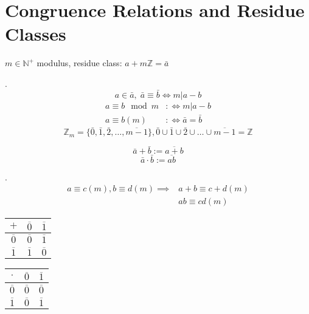 
\section{Congruence Relations and Residue Classes}

\begin{definition}
$m \in \mathbb{N}^{+}$ modulus,
residue class: $a+m \mathbb{Z} = \bar{a}$
\end{definition}

\Remark.
\[
  a\in \bar{a},\; \bar{a} \equiv \bar{b} \iff m | a-b
\]
\begin{align*}
  a \equiv b \mod m & :\iff m | a-b \\
  a \equiv b (m)     & :\iff \bar{a} = \bar{b}
\end{align*}
\[
  \mathbb{Z}_m = \{ \bar{0},\bar{1},\bar{2}, \ldots, \overline{m-1}\} ,
  \bar{0} \cup \bar{1} \cup \bar{2} \cup  \ldots \cup \overline{m-1} = \mathbb{Z}
\]

\begin{definition}
\[
  \bar{a} + \bar{b} := \overline{a+b}
\]
\[
  \bar{a} \cdot \bar{b} := \overline{ab}
\]
\end{definition}

\Remark.
\begin{align*}
  a \equiv c(m), b \equiv d(m) \implies & a+b \equiv c+d(m) \\
                                        & ab \equiv cd (m)
\end{align*}
\begin{center}
\begin{minipage}[t]{0.2\textwidth}
    \begin{tabular}{c|cc}
      $+$             & $\overline{0}$  & $\overline{1}$\\
      \hline
      $\overline{0}$  & $\overline{0}$  & $\overline{1}$\\
      $\overline{1}$  & $\overline{1}$  & $\overline{0}$\\
    \end{tabular}
\end{minipage}
\begin{minipage}[t]{0.2\textwidth}
  \begin{tabular}{c|cc}
    $\cdot$         & $\overline{0}$  & $\overline{1}$\\
    \hline
    $\overline{0}$  & $\overline{0}$  & $\overline{0}$\\
    $\overline{1}$  & $\overline{0}$  & $\overline{1}$\\
  \end{tabular}
\end{minipage}
\end{center}

